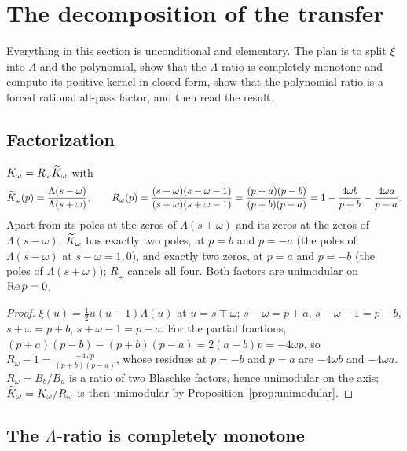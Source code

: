 \section{The decomposition of the transfer}\label{sec:decomposition}

Everything in this section is unconditional and elementary. The plan is to
split $\xi$ into $\Lambda$ and the polynomial, show that the $\Lambda$-ratio is
completely monotone and compute its positive kernel in closed form, show that
the polynomial ratio is a forced rational all-pass factor, and then read the
result.

\subsection{Factorization}

\begin{proposition}[Factorization]\label{prop:factor}
$K_\omega=R_\omega\widetilde K_\omega$ with
\begin{equation}\label{eq:factor}
 \widetilde K_\omega(p)=\frac{\Lambda(s-\omega)}{\Lambda(s+\omega)},\qquad
 R_\omega(p)=\frac{(s-\omega)(s-\omega-1)}{(s+\omega)(s+\omega-1)}
 =\frac{(p+a)(p-b)}{(p+b)(p-a)}
 =1-\frac{4\omega b}{p+b}-\frac{4\omega a}{p-a}.
\end{equation}
Apart from its poles at the zeros of $\Lambda(s+\omega)$ and its zeros at the
zeros of $\Lambda(s-\omega)$, $\widetilde K_\omega$ has exactly two poles, at $p=b$ and
$p=-a$ (the poles of $\Lambda(s-\omega)$ at $s-\omega=1,0$), and exactly two
zeros, at $p=a$ and $p=-b$ (the poles of $\Lambda(s+\omega)$); $R_\omega$
cancels all four. Both factors are unimodular on $\operatorname{Re} p=0$.
\end{proposition}
\begin{proof}
$\xi(u)=\frac12u(u-1)\Lambda(u)$ at $u=s\mp\omega$; $s-\omega=p+a$,
$s-\omega-1=p-b$, $s+\omega=p+b$, $s+\omega-1=p-a$. For the partial fractions,
$(p+a)(p-b)-(p+b)(p-a)=2(a-b)p=-4\omega p$, so
$R_\omega-1=\frac{-4\omega p}{(p+b)(p-a)}$, whose residues at $p=-b$ and $p=a$
are $-4\omega b$ and $-4\omega a$. $R_\omega=B_b/B_a$ is a ratio of two
Blaschke factors, hence unimodular on the axis; $\widetilde K_\omega=K_\omega/R_\omega$ is
then unimodular by Proposition~\ref{prop:unimodular}.
\end{proof}

\subsection{The \texorpdfstring{$\Lambda$}{Lambda}-ratio is completely monotone}

